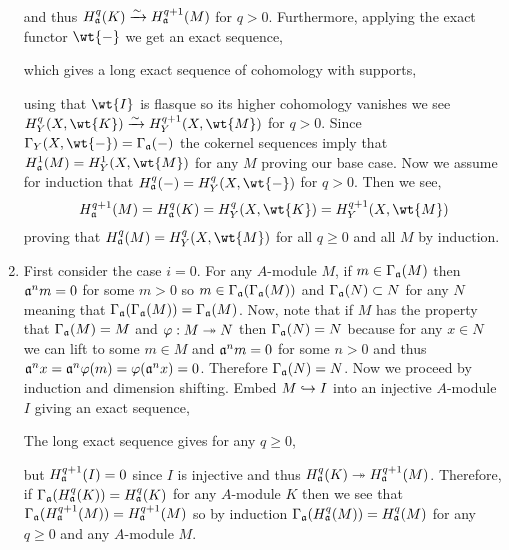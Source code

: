 \documentclass[12pt]{article}
\begin{document}
\begin{enumerate}
and thus $H^q_{\mathfrak{a}}(K) \xrightarrow{\sim} H^{q+1}_{\mathfrak{a}}(M)$ for $q > 0$. Furthermore, applying the exact functor $\wt{-}$ we get an exact sequence,
\begin{center}
\end{center}
which gives a long exact sequence of cohomology with supports,
\begin{center}
\end{center}
using that $\wt{I}$ is flasque so its higher cohomology vanishes we see $H^q_Y(X, \wt{K}) \iso H^{q+1}_Y(X, \wt{M})$ for $q > 0$. Since $\Gamma_Y(X, \wt{-}) = \Gamma_\a(-)$ the cokernel sequences imply that $H^1_\a(M) = H^1_Y(X, \wt{M})$ for any $M$ proving our base case.
Now we assume for induction that $H^q_\a(-) = H^q_Y(X, \wt{-})$ for $q > 0$. Then we see,
\[ H^{q+1}_\a(M) = H^q_\a(K) = H^q_Y(X, \wt{K}) = H^{q+1}_Y(X, \wt{M}) \]
proving that $H^q_\a(M) = H^q_Y(X, \wt{M})$ for all $q \ge 0$ and all $M$ by induction.

\item First consider the case $i = 0$. For any $A$-module $M$, if $m \in \Gamma_{\mathfrak{a}}(M)$ then $\mathfrak{a}^n m = 0$ for some $m > 0$ so $m \in \Gamma_{\mathfrak{a}}(\Gamma_{\mathfrak{a}}(M))$ and $\Gamma_{\mathfrak{a}}(N) \subset N$ for any $N$ meaning that $\Gamma_{\mathfrak{a}}(\Gamma_{\mathfrak{a}}(M)) = \Gamma_{\mathfrak{a}}(M)$. Now, note that if $M$ has the property that $\Gamma_{\mathfrak{a}}(M) = M$ and $\varphi : M \twoheadrightarrow N$ then $\Gamma_{\mathfrak{a}}(N) = N$ because for any $x \in N$ we can lift to some $m \in M$ and $\mathfrak{a}^n m = 0$ for some $n > 0$ and thus $\mathfrak{a}^n x = \mathfrak{a}^n \varphi(m)= \varphi(\mathfrak{a}^n x) = 0$. Therefore $\Gamma_{\mathfrak{a}}(N) = N$. Now we proceed by induction and dimension shifting. Embed $M \hookrightarrow I$ into an injective $A$-module $I$ giving an exact sequence,
\begin{center}
\end{center}
The long exact sequence gives for any $q \ge 0$,
\begin{center}
\end{center}
but $H^{q+1}_{\mathfrak{a}}(I) = 0$ since $I$ is injective and thus $H^q_{\mathfrak{a}}(K) \twoheadrightarrow H^{q+1}_{\mathfrak{a}}(M)$. Therefore, if $\Gamma_{\mathfrak{a}}(H^q_{\mathfrak{a}}(K)) = H^q_{\mathfrak{a}}(K)$ for any $A$-module $K$ then we see that $\Gamma_{\mathfrak{a}}(H^{q+1}_{\mathfrak{a}}(M)) = H^{q+1}_{\mathfrak{a}}(M)$ so by induction $\Gamma_{\mathfrak{a}}(H^{q}_{\mathfrak{a}}(M)) = H^q_{\mathfrak{a}}(M)$ for any $q \ge 0$ and any $A$-module $M$.
\end{enumerate}
\end{document}
